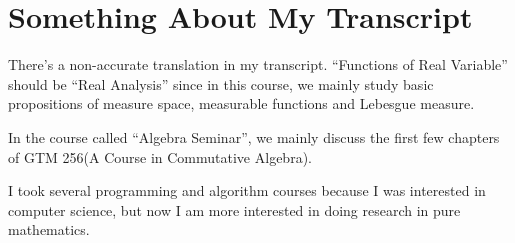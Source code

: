 \documentclass[12pt]{article}
\newcommand{\bb}[1]{\mathbb{#1}}
\theoremstyle{definition}
\begin{document}

\section{Something About My Transcript}
There's a non-accurate translation in my transcript.
“Functions of Real Variable” should be “Real Analysis” since in this course, we mainly study basic 
propositions of measure space, measurable functions and Lebesgue measure.

In the course called “Algebra Seminar”, we mainly discuss the first few chapters of 
GTM 256(A Course in Commutative Algebra).

I took several programming and algorithm courses because I was interested in computer science, but now I am more interested in doing research in pure mathematics.
\end{document}

